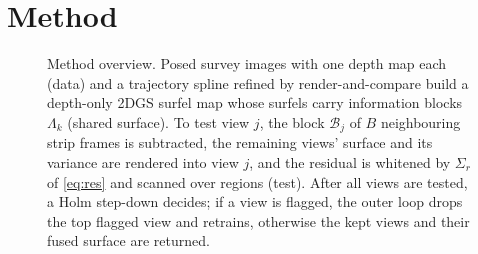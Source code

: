 \section{Method}
\label{sec:method}

\begin{figure}[!t]
\centering

\caption{Method overview. Posed survey images with one depth map each (data) and a trajectory spline
refined by render-and-compare build a depth-only 2DGS surfel map whose surfels carry information blocks
$\Lambda_k$ (shared surface). To test view $j$, the block $\mathcal{B}_j$ of $B$ neighbouring strip frames
is subtracted, the remaining views' surface and its variance are rendered into view $j$, and the residual
is whitened by $\Sigma_r$ of \eqref{eq:res} and scanned over regions (test). After all views are tested, a
Holm step-down decides; if a view is flagged, the outer loop drops the top flagged view and retrains,
otherwise the kept views and their fused surface are returned.}
\label{fig:pipeline}
\end{figure}

